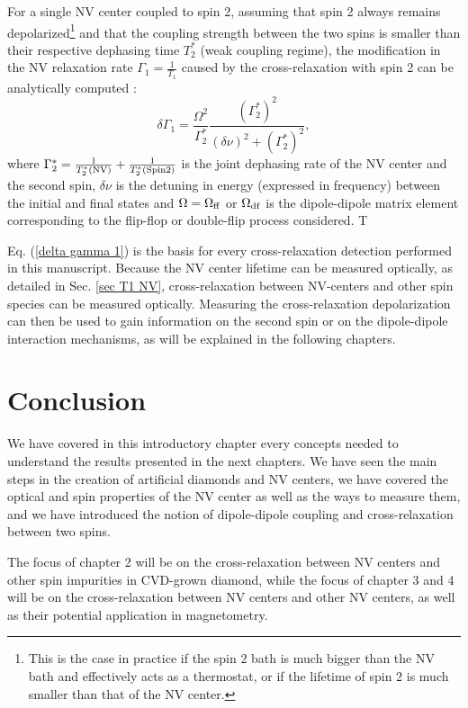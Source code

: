 \documentclass[a4paper,11pt]{report}
\begin{document}
For a single NV center coupled to spin 2, assuming that spin 2 always remains depolarized\footnote{This is the case in practice if the spin 2 bath is much bigger than the NV bath and effectively acts as a thermostat, or if the lifetime of spin 2 is much smaller than that of the NV center.} and that the coupling strength between the two spins is smaller than their respective dephasing time $T_2^*$ (weak coupling regime), the modification in the NV relaxation rate $\Gamma_1=\frac{1}{T_1}$ caused by the cross-relaxation with spin 2 can be analytically computed \citep{hall2016detection}:
\begin{equation}
\delta \Gamma_1=\frac{\Omega^2}{\Gamma_2^*} \frac{(\Gamma_2^*)^2}{(\delta \nu)^2+(\Gamma_2^*)^2},
\label{delta gamma 1}
\end{equation}
where $\Gamma_2^*=\frac{1}{T_2^*(\rm NV)}+\frac{1}{T_2^*(\rm Spin 2)}$ is the joint dephasing rate of the NV center and the second spin, $\delta \nu$ is the detuning in energy (expressed in frequency) between the initial and final states and $\Omega=\Omega_{\rm ff}$ or $\Omega_{\rm df}$ is the dipole-dipole matrix element corresponding to the flip-flop or double-flip process considered. T

Eq. (\ref{delta gamma 1}) is the basis for every cross-relaxation detection performed in this manuscript. Because the NV center lifetime can be measured optically, as detailed in Sec. \ref{sec T1 NV}, cross-relaxation between NV-centers and other spin species can be measured optically. Measuring the cross-relaxation depolarization can then be used to gain information on the second spin or on the dipole-dipole interaction mechanisms, as will be explained in the following chapters.

\section{Conclusion}

We have covered in this introductory chapter every concepts needed to understand the results presented in the next chapters. We have seen the main steps in the creation of artificial diamonds and NV centers, we have covered the optical and spin properties of the NV center as well as the ways to measure them, and we have introduced the notion of dipole-dipole coupling and cross-relaxation between two spins.

The focus of chapter 2 will be on the cross-relaxation between NV centers and other spin impurities in CVD-grown diamond, while the focus of chapter 3 and 4 will be on the cross-relaxation between NV centers and other NV centers, as well as their potential application in magnetometry.
\printbibliography
\end{document}
